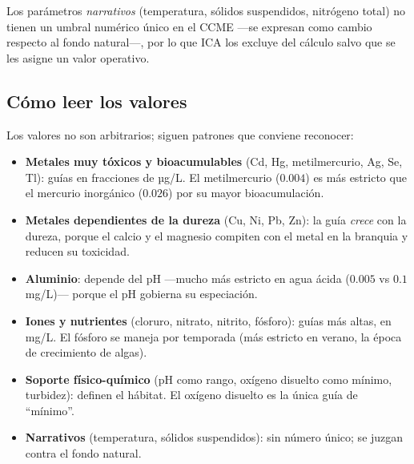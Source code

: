 \documentclass[11pt,a4paper]{article}
\begin{document}
{\footnotesize Los parámetros \emph{narrativos} (temperatura, sólidos suspendidos, nitrógeno total) no
tienen un umbral numérico único en el CCME —se expresan como cambio respecto al fondo natural—, por lo
que ICA los excluye del cálculo salvo que se les asigne un valor operativo.}

\subsection{Cómo leer los valores}
Los valores no son arbitrarios; siguen patrones que conviene reconocer:
\begin{itemize}[leftmargin=1.2em]
  \item \textbf{Metales muy tóxicos y bioacumulables} (Cd, Hg, metilmercurio, Ag, Se, Tl): guías en
  fracciones de µg/L. El metilmercurio ($0.004$) es más estricto que el mercurio inorgánico ($0.026$)
  por su mayor bioacumulación.
  \item \textbf{Metales dependientes de la dureza} (Cu, Ni, Pb, Zn): la guía \emph{crece} con la dureza,
  porque el calcio y el magnesio compiten con el metal en la branquia y reducen su toxicidad.
  \item \textbf{Aluminio}: depende del pH —mucho más estricto en agua ácida ($0.005$ vs $0.1$ mg/L)—
  porque el pH gobierna su especiación.
  \item \textbf{Iones y nutrientes} (cloruro, nitrato, nitrito, fósforo): guías más altas, en mg/L. El
  fósforo se maneja por temporada (más estricto en verano, la época de crecimiento de algas).
  \item \textbf{Soporte físico-químico} (pH como rango, oxígeno disuelto como mínimo, turbidez):
  definen el hábitat. El oxígeno disuelto es la única guía de ``mínimo''.
  \item \textbf{Narrativos} (temperatura, sólidos suspendidos): sin número único; se juzgan contra el
  fondo natural.
\end{itemize}
\end{document}
